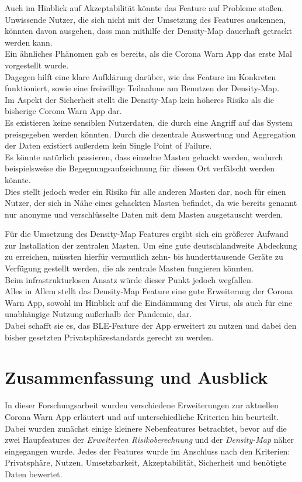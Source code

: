 \documentclass[conference,compsoc]{IEEEtran}
\begin{document}
Auch im Hinblick auf Akzeptabilität könnte das Feature auf Probleme stoßen.\\
Unwissende Nutzer, die sich nicht mit der Umsetzung des Features auskennen, könnten davon ausgehen, dass man mithilfe der Density-Map dauerhaft getrackt werden kann.\\
Ein ähnliches Phänomen gab es bereits, als die Corona Warn App das erste Mal vorgestellt wurde.\\
Dagegen hilft eine klare Aufklärung darüber, wie das Feature im Konkreten funktioniert, sowie eine freiwillige Teilnahme am Benutzen der Density-Map.\\

Im Aspekt der Sicherheit stellt die Density-Map kein höheres Risiko als die bisherige Corona Warn App dar.\\ 
Es existieren keine sensiblen Nutzerdaten, die durch eine Angriff auf das System preisgegeben werden könnten. Durch die dezentrale Auswertung und Aggregation der Daten existiert außerdem kein Single Point of Failure.\\
Es könnte natürlich passieren, dass einzelne Masten gehackt werden, wodurch beispielsweise die Begegnungsaufzeichnung für diesen Ort verfälscht werden könnte.\\
Dies stellt jedoch weder ein Risiko für alle anderen Masten dar, noch für einen Nutzer, der sich in Nähe eines gehackten Masten befindet, da wie bereits genannt nur anonyme und verschlüsselte Daten mit dem Masten ausgetauscht werden.

Für die Umsetzung des Density-Map Features ergibt sich ein größerer Aufwand zur Installation der zentralen Masten. Um eine gute deutschlandweite Abdeckung zu erreichen, müssten hierfür vermutlich zehn- bis hunderttausende Geräte zu Verfügung gestellt werden, die als zentrale Masten fungieren könnten.\\
Beim infrastrukturlosen Ansatz würde dieser Punkt jedoch wegfallen.\\

Alles in Allem stellt das Density-Map Feature eine gute Erweiterung der Corona Warn App, sowohl im Hinblick auf die Eindämmung des Virus, als auch für eine unabhängige Nutzung außerhalb der Pandemie, dar.\\
Dabei schafft sie es, das BLE-Feature der App erweitert zu nutzen und dabei den bisher gesetzten Privatsphärestandards gerecht zu werden. 

\section{Zusammenfassung und Ausblick} \label{Conclusion}
In dieser Forschungsarbeit wurden verschiedene Erweiterungen zur aktuellen Corona Warn App erläutert und auf unterschiedliche Kriterien hin beurteilt. 
Dabei wurden zunächst einige kleinere Nebenfeatures betrachtet, bevor auf die zwei Haupfeatures der \textit{Erweiterten Risikoberechnung} und der \textit{Density-Map} näher eingegangen wurde. 
Jedes der Features wurde im Anschluss nach den Kriterien: Privatsphäre, Nutzen, Umsetzbarkeit, Akzeptabilität, Sicherheit und benötigte Daten bewertet. 
\end{document}
